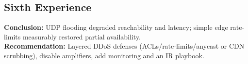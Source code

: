 \subsection*{Sixth Experience}
\textbf{Conclusion:} UDP flooding degraded reachability and latency; simple edge rate-limits measurably restored partial availability.\\
\textbf{Recommendation:} Layered DDoS defenses (ACLs/rate-limits/anycast or CDN scrubbing), disable amplifiers, add monitoring and an IR playbook.

%
